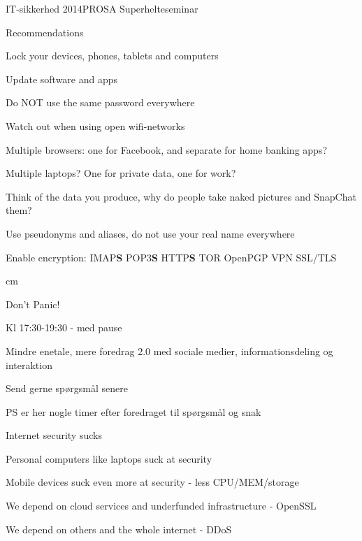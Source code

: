 \documentclass[20pt,landscape,a4paper,footrule]{foils}
\begin{document}


\mytitlepage
{IT-sikkerhed 2014}{PROSA Superhelteseminar}



Recommendations 
\begin{list2}
\item Lock your devices, phones, tablets and computers
\item Update software and apps
\item Do NOT use the same password everywhere
\item Watch out when using open wifi-networks
\item Multiple browsers: one for Facebook, and separate for home banking apps?
\item Multiple laptops? One for private data, one for work?
\item Think of the data you produce, why do people take naked pictures and SnapChat them?
\item Use pseudonyms and aliases, do not use your real name everywhere
\item Enable encryption: IMAP{\bf S} POP3{\bf S}
  HTTP{\bf S} TOR OpenPGP VPN SSL/TLS
\end{list2}



 cm

\centerline{\color{titlecolor}\LARGE Don't Panic!}

\begin{list1}
\item Kl 17:30-19:30 - med pause
\item Mindre enetale, mere foredrag 2.0 med sociale medier, informationsdeling og interaktion
\end{list1}
\centerline{Send gerne spørgsmål senere}
{\footnotesize PS er her nogle timer efter foredraget til spørgsmål og snak}




\begin{list1}
\item Internet security sucks
\item Personal computers like laptops suck at security
\item Mobile devices suck even more at security - less CPU/MEM/storage
\item We depend on cloud services and underfunded infrastructure - OpenSSL
\item We depend on others and the whole internet - DDoS
\end{list1}
\end{document}
